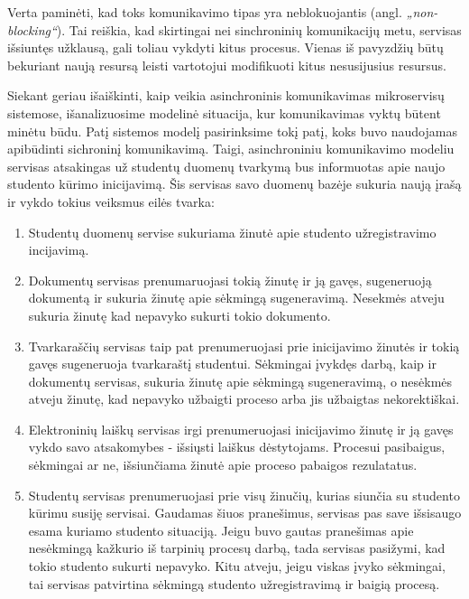 Verta paminėti, kad toks komunikavimo tipas yra neblokuojantis (angl. \textit{„non-blocking“}). Tai reiškia, kad skirtingai nei sinchroninių
komunikacijų metu, servisas išsiuntęs užklausą, gali toliau vykdyti kitus procesus. Vienas iš pavyzdžių būtų bekuriant naują resursą leisti
vartotojui modifikuoti kitus nesusijusius resursus.

Siekant geriau išaiškinti, kaip veikia asinchroninis komunikavimas mikroservisų sistemose, išanalizuosime modelinė situacija, kur komunikavimas vyktų būtent
minėtu būdu. Patį sistemos modelį pasirinksime tokį patį, koks buvo naudojamas apibūdinti sichroninį komunikavimą.
Taigi, asinchroniniu komunikavimo modeliu servisas atsakingas už studentų duomenų tvarkymą bus informuotas apie naujo studento kūrimo inicijavimą.
Šis servisas savo duomenų bazėje sukuria naują įrašą ir vykdo tokius veiksmus eilės tvarka:

\begin{enumerate}
  \item Studentų duomenų servise sukuriama žinutė apie studento užregistravimo incijavimą.
  \item Dokumentų servisas prenumaruojasi tokią žinutę ir ją gavęs, sugeneruoją dokumentą ir sukuria žinutę apie
   sėkmingą sugeneravimą. Nesekmės atveju sukuria žinutę kad nepavyko sukurti tokio dokumento.
  \item Tvarkaraščių servisas taip pat prenumeruojasi prie inicijavimo žinutės ir tokią gavęs sugeneruoja tvarkaraštį studentui.
  Sėkmingai įvykdęs darbą, kaip ir dokumentų servisas, sukuria žinutę apie sėkmingą sugeneravimą, o nesėkmės atveju žinutę, kad nepavyko užbaigti proceso
  arba jis užbaigtas nekorektiškai.
  \item Elektroninių laiškų servisas irgi prenumeruojasi inicijavimo žinutę ir ją gavęs vykdo savo atsakomybes - išsiųsti laiškus dėstytojams.
  Procesui pasibaigus, sėkmingai ar ne, išsiunčiama žinutė apie proceso pabaigos rezulatatus.
  \item Studentų servisas prenumeruojasi prie visų žinučių, kurias siunčia su studento kūrimu susiję servisai. Gaudamas šiuos pranešimus, servisas pas save išsisaugo
  esama kuriamo studento situaciją. Jeigu buvo gautas pranešimas apie nesėkmingą kažkurio iš tarpinių procesų darbą, tada servisas pasižymi, kad tokio studento sukurti nepavyko.
  Kitu atveju, jeigu viskas įvyko sėkmingai, tai servisas patvirtina sėkmingą studento užregistravimą ir baigią procesą. 
\end{enumerate}

